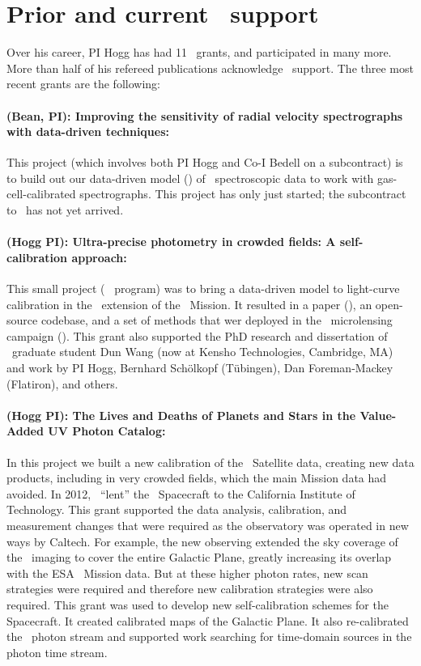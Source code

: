 \documentclass[12pt, letterpaper]{article}
\begin{document}
\section{Prior and current \NASA\ support}

Over his career, PI Hogg has had 11 \NASA\ grants, and participated in
many more.
More than half of his refereed publications acknowledge \NASA\ support.
The three most recent grants are the following:

\paragraph{ (Bean, PI):
Improving the sensitivity of radial velocity spectrographs with data-driven techniques:}
This project (which involves both PI Hogg and Co-I Bedell on a subcontract)
is to
build out our data-driven model (\wobble) of \EPRV\ spectroscopic data
to work with gas-cell-calibrated spectrographs. This project has only
just started; the subcontract to \NYU\ has not yet arrived.

\paragraph{ (Hogg PI):
Ultra-precise photometry in crowded fields: A self-calibration approach:}
This small project (\Ktwo\  program)
was to bring a data-driven model to light-curve calibration
in the \Ktwo\ extension of the \Kepler\ Mission.
It resulted in a paper (\citealt{CPMdiff}), an open-source codebase,
and a set of methods that wer deployed in the \Ktwo\ microlensing campaign (\citealt{K2C9}).
This grant also supported the PhD research and dissertation of \NYU\ graduate
student Dun Wang (now at Kensho Technologies, Cambridge, MA) and work
by PI Hogg, Bernhard Sch\"olkopf (T\"ubingen), Dan Foreman-Mackey
(Flatiron), and others.

\paragraph{ (Hogg PI):
The Lives and Deaths of Planets and Stars in the Value-Added UV Photon Catalog:}
In this project we built a new calibration of the \GALEX\ Satellite
data, creating new data products, including in very crowded fields,
which the main Mission data had avoided.
In 2012, \NASA\ ``lent'' the \GALEX\ Spacecraft to the California Institute of Technology.
This grant supported the data analysis, calibration, and measurement
changes that were required as the observatory was operated in new
ways by Caltech.
For example, the new observing extended the sky coverage of the \GALEX\ imaging to
cover the entire Galactic Plane, greatly increasing its overlap with
the ESA \Gaia\ Mission data.
But at these higher photon rates, new scan strategies were required and therefore
new calibration strategies were also required.
This grant was used to develop new self-calibration schemes for the Spacecraft.
It created calibrated maps of the Galactic Plane.
It also re-calibrated the \GALEX\ photon stream and supported work
searching for time-domain sources in the photon time stream.
\end{document}
